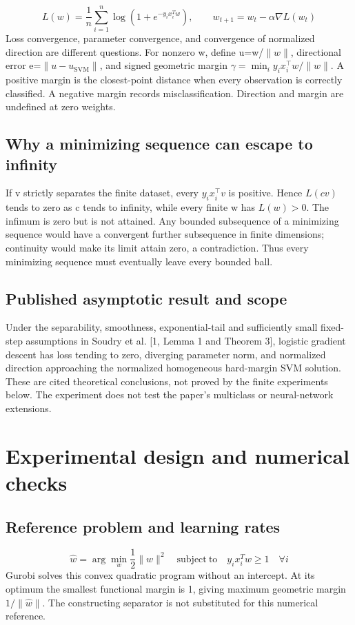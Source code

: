 \documentclass[12pt,a4paper]{article}
\begin{document}
\[
L(w)=\frac{1}{n}\sum_{i=1}^{n}\log(1+e^{-y_i x_i^T w}),\qquad w_{t+1}=w_t-\alpha\nabla L(w_t)
\]
Loss convergence, parameter convergence, and convergence of normalized direction are different questions. For nonzero w, define u=w/$\|w\|$, directional error e=$\|u-u_{\mathrm{SVM}}\|$, and signed geometric margin $\gamma=\min_i y_i x_i^\top w/\|w\|$. A positive margin is the closest-point distance when every observation is correctly classified. A negative margin records misclassification. Direction and margin are undefined at zero weights.

\subsection{Why a minimizing sequence can escape to infinity}
If v strictly separates the finite dataset, every $y_i x_i^\top v$ is positive. Hence $L(cv)$ tends to zero as c tends to infinity, while every finite w has $L(w)>0$. The infimum is zero but is not attained. Any bounded subsequence of a minimizing sequence would have a convergent further subsequence in finite dimensions; continuity would make its limit attain zero, a contradiction. Thus every minimizing sequence must eventually leave every bounded ball.

\subsection{Published asymptotic result and scope}
Under the separability, smoothness, exponential-tail and sufficiently small fixed-step assumptions in Soudry et al. [1, Lemma 1 and Theorem 3], logistic gradient descent has loss tending to zero, diverging parameter norm, and normalized direction approaching the normalized homogeneous hard-margin SVM solution. These are cited theoretical conclusions, not proved by the finite experiments below. The experiment does not test the paper's multiclass or neural-network extensions.

\FloatBarrier
\section{Experimental design and numerical checks}
\subsection{Reference problem and learning rates}
\[
\widehat w=\arg\min_w\frac{1}{2}\|w\|^2\quad\mathrm{subject\ to}\quad y_i x_i^T w\geq1\quad\forall i
\]
Gurobi solves this convex quadratic program without an intercept. At its optimum the smallest functional margin is 1, giving maximum geometric margin $1/\|\widehat{w}\|$. The constructing separator is not substituted for this numerical reference.
\end{document}

